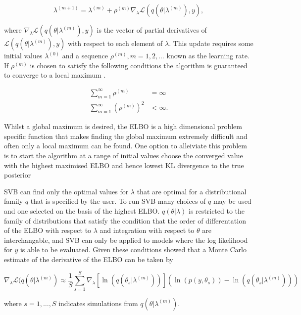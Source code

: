 \documentclass[12pt,a4paper]{article}%
\numberwithin{equation}{section}
\begin{document}
\begin{equation}
\label{SGA1}
\lambda^{(m+1)} = \lambda^{(m)} + \rho^{(m)} \nabla_{\lambda} \mathcal{L}(q(\theta | \lambda^{(m)}), y),
\end{equation}

where $\nabla_{\lambda}\mathcal{L}(q(\theta | \lambda^{(m)}), y)$ is the vector of partial derivatives of $\mathcal{L}(q(\theta | \lambda^{(m)}), y)$ with respect to each element of $\lambda$. This update requires some initial values $\lambda^{(0)}$ and a sequence $\rho^{(m)}, m = 1, 2, \dots$ known as the learning rate. If $\rho^{(m)}$ is chosen to satisfy the following conditions the algorithm is guaranteed to converge to a local maximum \citep{Robbins1951}.

\begin{align}
\sum_{m=1}^{\infty} \rho^{(m)} &=  \infty \\
\sum_{m=1}^{\infty} (\rho^{(m)})^2 &<  \infty.
\end{align}

Whilst a global maximum is desired, the ELBO is a high dimensional problem specific function that makes finding the global maximum extremely difficult and often only a local maximum can be found. One option to alleiviate this problem is to start the algorithm at a range of initial values choose the converged value with the highest maximised ELBO and hence lowest KL divergence to the true posterior 

SVB can find only the optimal values for $\lambda$ that are optimal for a distributional family $q$ that is specified by the user. To run SVB many choices of $q$ may be used and one selected on the basis of the highest ELBO. $q(\theta | \lambda)$ is restricted to the family of distributions that satisfy the condition that the order of differentation of the ELBO with respect to $\lambda$ and integration with respect to $\theta$ are interchangable, and SVB can only be applied to models where the log likelihood for $y$ is able to be evaluated. Given these conditions \citet{Ranganath2014} showed that a Monte Carlo estimate of the derivative of the ELBO can be taken by

\begin{equation}
\label{SGA2}
\nabla_{\lambda}\mathcal{L}(q(\theta | \lambda^{(m)}) \approx \frac{1}{S}\sum_{s=1}^{S} \nabla_{\lambda} [\ln(q(\theta_s | \lambda^{(m)}))] (\ln (p(y, \theta_s)) - \ln(q(\theta_s | \lambda^{(m)})))
\end{equation}

where $s = 1, \dots, S$ indicates simulations from $q(\theta | \lambda^{(m)})$.
\end{document}
